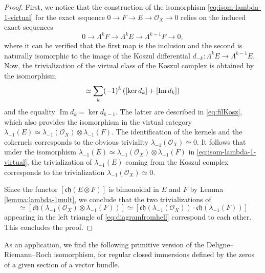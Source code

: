 \documentclass[JEP,XML,SOM,Unicode,published]{cedram}
\theoremstyle{plain}
\theoremstyle{definition}
\newcommand{\Ocal}{\mathcal O}
\newcommand{\chfrak}{\mathfrak {ch}}
\DeclareMathOperator{\Imag}{Im}
\begin{document}
\begin{proof}
First, we notice that the construction of the isomorphism \eqref{eq:isom-lambda-1-virtual} for the exact sequence $0\to F\to E\to\Ocal_{X}\to 0$ relies on the induced exact sequences\vspace*{-3pt}
\begin{equation}\label{eq:filKosz}
0\to\Lambda^{k}F\to \Lambda^{k}E\to\Lambda^{k-1}F\to 0,
\end{equation}
where it can be verified that the first map is the inclusion and the second is naturally isomorphic to the image of the Koszul differential $d_{-k}\colon\Lambda^{k}E\to\Lambda^{k-1}E$. Now, the trivialization of the virtual class of the Koszul complex is obtained by the isomorphism\vspace*{-3pt}
\begin{displaymath}
[K(\sigma)]\simeq \sum_{k}(-1)^{k} \left([\ker d_{k}]+ [\Imag d_{k}]\right)\vspace*{-3pt}
\end{displaymath}
and the equality $\Imag d_{k} = \ker d_{k-1}$. The latter are described in \eqref{eq:filKosz}, which also provides the isomorphism in the virtual category $\lambda_{-1}(E) \simeq \lambda_{-1}(\Ocal_X) \otimes \lambda_{-1}(F)$. The identification of the kernels and the cokernels corresponds to the obvious triviality $\lambda_{-1}(\Ocal_X) \simeq 0$. It follows that under the isomorphism $\lambda_{-1}(E)\simeq \lambda_{-1}(\Ocal_X) \otimes \lambda_{-1}(F)$ in
\eqref{eq:isom-lambda-1-virtual}, the trivialization of $\lambda_{-1}(E)$ coming from the Koszul complex corresponds to the trivialization $\lambda_{-1}(\Ocal_X)\simeq 0$.

Since the functor $[\chfrak(E \otimes F)]$ is bimonoidal in $E$ and $F$ by Lemma \ref{lemma:lambda-1mult}, we conclude that the two trivializations of\vspace*{-3pt}\enlargethispage{.5\baselineskip}
\begin{displaymath}
[\chfrak(\lambda_{-1}(E))] \simeq [\chfrak(\lambda_{-1}(\Ocal_X) \otimes \lambda_{-1}(F))] \simeq [\chfrak(\lambda_{-1}(\Ocal_X)) \cdot \chfrak(\lambda_{-1}(F))]
\end{displaymath}
appearing in the left triangle of \eqref{eq:diagramfromhell} correspond to each other. This concludes the proof.
\end{proof}

As an application, we find the following primitive version of the Deligne--Riemann--Roch isomorphism, for regular closed immersions defined by the zeros of a given section of a vector bundle.
\end{document}
